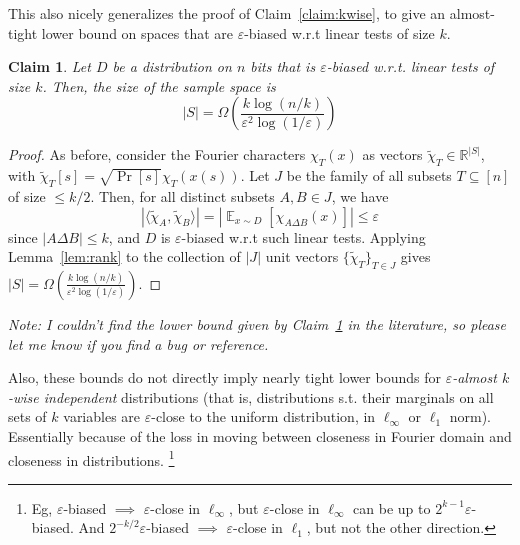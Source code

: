\documentclass[]{article}
\newtheorem{claim}[theorem]{Claim}
\newcommand{\1}{\mathbb{1}}
\newcommand{\R}{\mathbb{R}}
\newcommand{\E}{\mathop{\mathbb{E}}}
\renewcommand{\epsilon}{\varepsilon}
\newcommand{\innp}[1]{\langle #1 \rangle}
\renewcommand{\t}{\widetilde}
\begin{document}
This also nicely generalizes the proof of Claim~\ref{claim:kwise}, to
give an almost-tight lower bound on spaces that
are $\epsilon$-biased w.r.t linear tests of size $k$.

\begin{claim}
    \label{claim:keps}
    Let $D$ be a distribution on $n$ bits that is $\epsilon$-biased w.r.t.
    linear tests of size $k$.
    Then, the size of the sample space is
    $$|S| = \Omega\left(\frac{k \log (n/k)}{\epsilon^2 \log(1/\epsilon)}\right)$$
\end{claim}
\begin{proof}
    As before,
consider the Fourier characters $\chi_T(x)$
as vectors $\t \chi_T \in \R^{|S|}$, with
$\t \chi_T[s] = \sqrt{\Pr[s]} \chi_T(x(s))$.
Let $J$ be the family of all subsets $T \subseteq [n]$ of size $\leq k/2$.
Then, for all distinct subsets $A, B \in J$, we have
$$\left|\innp{\t \chi_A, \t \chi_B}\right| = \left|\E_{x \sim D}[\chi_{A \Delta B}(x)]\right| \leq
\epsilon$$
since $|A \Delta B| \leq k$, and $D$ is $\epsilon$-biased w.r.t such linear tests.
Applying Lemma~\ref{lem:rank} to the collection of $|J|$ unit vectors $\{\t \chi_T\}_{T \in J}$
gives
    $|S| = \Omega(\frac{k \log (n/k)}{\epsilon^2 \log(1/\epsilon)})$.
\end{proof}

{\it Note: I couldn't find the lower bound given by Claim~\ref{claim:keps} in
    the literature, so please let me know
if you find a bug or reference.

Also, these bounds do not directly imply nearly tight lower bounds for
\emph{$\epsilon$-almost $k$-wise independent} distributions
(that is, distributions s.t. their marginals on all sets of $k$ variables are
$\epsilon$-close to the uniform distribution, in $\ell_{\infty}$ or $\ell_{1}$
norm). Essentially because of the loss in moving between closeness in Fourier
domain and closeness in distributions.
\footnote{
    Eg, $\epsilon$-biased $\implies$ $\epsilon$-close in $\ell_{\infty}$,
    but $\epsilon$-close in $\ell_{\infty}$ can be up to $2^{k-1}\epsilon$-biased.
    And $2^{-k/2}\epsilon$-biased $\implies$ $\epsilon$-close in $\ell_{1}$, but
    not the other direction.
    }
}

{}

\end{document}
